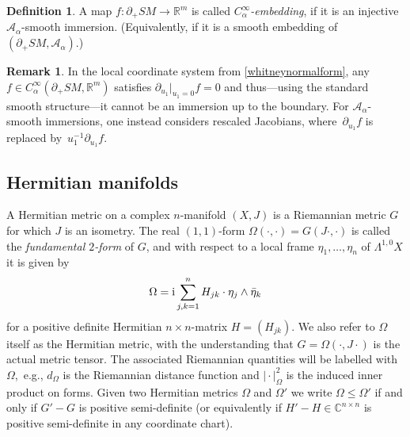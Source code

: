 \documentclass[10pt,a4paper]{amsart}
\numberwithin{equation}{section}
\theoremstyle{definition}
\newtheorem{Definition}[Theorem]{Definition}
\newtheorem{Remark}[Theorem]{Remark}
\newcommand{\R}{\mathbb{R}} %
\newcommand{\C}{\mathbb{C}} %
\newcommand{\1}{{\bf 1}}
\begin{document}
\begin{Definition}\label{def_calphaemb}
	A map $f\colon \partial_+SM\rightarrow \R^m$ is called {\it $C_\alpha^\infty$-embedding}, if it is an injective $\mathcal A_\alpha$-smooth immersion. (Equivalently, if it is a smooth embedding of $(\partial_+SM,\mathcal A_\alpha)$.)
\end{Definition}

\begin{Remark} In the local coordinate system from \eqref{whitneynormalform}, any $f\in C_\alpha^\infty(\partial_+SM,\R^m)$ satisfies ${\partial_{u_1}|_{u_1=0}f = 0}$ and thus---using the standard smooth structure---it cannot be an immersion up to the boundary. For $\mathcal A_\alpha$-smooth immersions, one instead considers rescaled Jacobians, where~$\partial_{u_1}f$ is replaced by~$u_1^{-1}\partial_{u_1}f$.
\end{Remark}

\subsection{Hermitian manifolds}\label{s_metriccx} A Hermitian metric on a complex $n$-manifold $(X,J)$ is a Riemannian metric $G$ for which $J$ is an isometry. The real $(1,1)$-form $\Omega(\cdot,\cdot)=G(J\cdot,\cdot)$ is called the {\it fundamental $2$-form} of $G$, and with respect to a local frame $\eta_1,\dots,\eta_n$ of $\Lambda^{1,0}X$ it is given by
\begin{equation}\label{generalomegah}
\Omega = {\rm i} \sum_{j,k=1}^n H_{jk} \cdot \eta_j\wedge\bar\eta_k
\end{equation}
for a positive definite Hermitian $n\times n$-matrix $H=(H_{jk})$. We also refer to $\Omega$ itself as the Hermitian metric, with the understanding that $G=\Omega(\cdot,J\cdot)$ is the actual metric tensor. The associated Riemannian quantities will be labelled with $\Omega$,~e.g., $d_\Omega$ is the Riemannian distance function and $\vert\cdot\vert_\Omega^2$ is the induced inner product on forms.
Given two Hermitian metrics $\Omega$ and $\Omega'$ we write $\Omega \le \Omega'$ if and only if $G'-G$ is positive semi-definite (or equivalently if $H'-H\in \C^{n\times n}$ is positive semi-definite in any coordinate chart).
\end{document}
